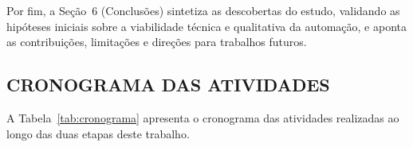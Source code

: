 Por fim, a Seção~6 (Conclusões) sintetiza as descobertas do estudo, validando as hipóteses iniciais sobre a viabilidade técnica e qualitativa da automação, e aponta as contribuições, limitações e direções para trabalhos futuros.



\subsection{CRONOGRAMA DAS ATIVIDADES}

A Tabela~\ref{tab:cronograma} apresenta o cronograma das atividades realizadas ao longo das duas etapas deste trabalho.

%


